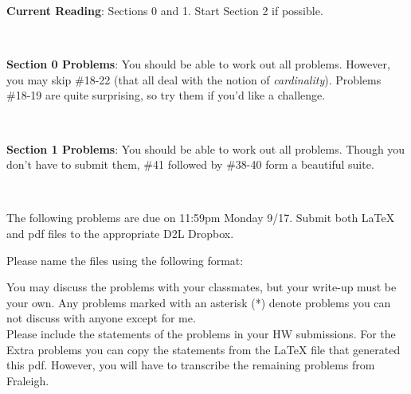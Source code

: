 \documentclass[12pt]{article}
\begin{document}
{\bf Current Reading}: Sections 0 and 1. Start Section 2 if possible.

\

{\bf Section 0 Problems}: You should be able to work out all problems. However, you may skip \#18-22 (that all deal with the notion of {\it cardinality}). Problems \#18-19 are quite surprising, so try them if you'd like a challenge.

\

{\bf Section 1 Problems}: You should be able to work out all problems. Though you don't have to submit them, \#41 followed by \#38-40 form a beautiful suite. 

\hrulefill

\

The following problems are due on 11:59pm Monday 9/17.  Submit both LaTeX and pdf files to the appropriate D2L Dropbox. 

Please name the files using the following format:
\begin{center}
\end{center}

You may discuss the problems with your classmates, but your write-up must be your own.  Any problems marked with an asterisk (*) denote problems you can not discuss with anyone except for me.\\

Please include the statements of the problems in your HW submissions. For the Extra problems you can copy the statements from the LaTeX file that generated this pdf. However, you will have to transcribe the remaining problems from Fraleigh.

\
\end{document}
